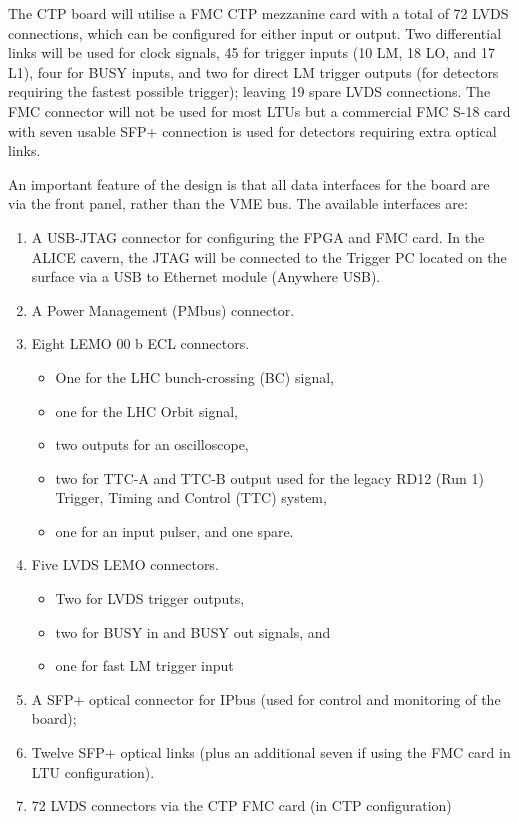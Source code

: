 The CTP board will utilise a FMC CTP mezzanine card with a total of 72 LVDS connections, which can be configured for either input or output. Two differential links will be used for clock signals, 45 for trigger inputs (10 LM, 18 LO, and 17 L1), four for BUSY inputs, and two for direct LM trigger outputs (for detectors requiring the fastest possible trigger); leaving 19 spare LVDS connections. The FMC connector will not be used for most LTUs but a commercial FMC S-18 card with seven usable SFP+ connection is used for detectors requiring extra optical links.

An important feature of the design is that all data interfaces for the board are via the front panel, rather than the VME bus. The available interfaces are:
\begin{enumerate}
\item A USB-JTAG connector for configuring the FPGA and FMC card. In the ALICE cavern, the JTAG will be connected to the Trigger PC located on the surface via a USB to Ethernet module (Anywhere USB).
\item A Power Management (PMbus) connector.
\item Eight LEMO 00 b ECL connectors.
\begin{itemize}
\item One for the LHC bunch-crossing (BC) signal,
\item one for the LHC Orbit signal,
\item two outputs for an oscilloscope,
\item two for TTC-A and TTC-B output used for the legacy RD12 (Run 1) Trigger, Timing and Control (TTC) system,
\item one for an input pulser, and one spare.
\end{itemize}
\item Five LVDS LEMO connectors.
\begin{itemize}
\item Two for LVDS trigger outputs,
\item two for BUSY in and BUSY out signals, and
\item one for fast LM trigger input
\end{itemize}
\item A SFP+ optical connector for IPbus (used for control and monitoring of the board); 
\item Twelve SFP+ optical links (plus an additional seven if using the FMC card in LTU configuration). 
\item 72 LVDS connectors via the CTP FMC card (in CTP configuration)
\end{enumerate}
     
